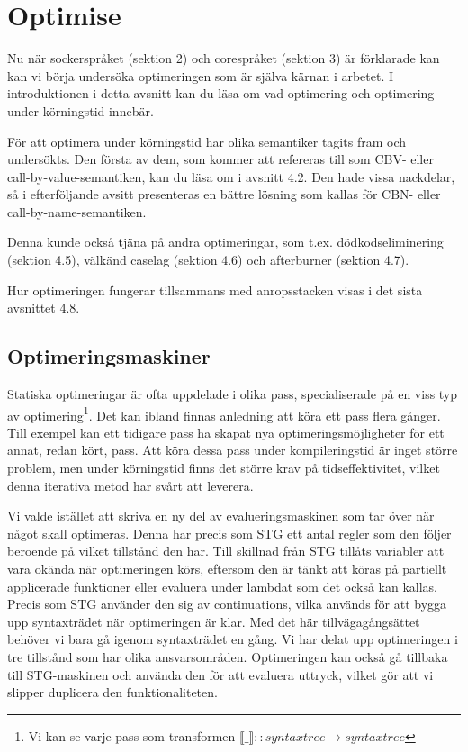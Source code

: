 \documentclass[Rapport]{subfiles}
\begin{document}
\section{Optimise}
\label{sec:Optimise}

\overviewOptimise

Nu när sockerspråket (sektion 2) och corespråket (sektion 3) är förklarade
kan kan vi börja undersöka optimeringen som är själva kärnan i arbetet.
I introduktionen i detta avsnitt kan du läsa om vad optimering och 
optimering under körningstid innebär. 

För att optimera under körningstid har olika semantiker tagits fram och undersökts.   
Den första av dem, som kommer att refereras till som CBV- eller call-by-value-semantiken, 
kan du läsa om i avsnitt 4.2. Den hade vissa nackdelar, så i 
efterföljande avsitt presenteras en bättre lösning som kallas för CBN- eller call-by-name-semantiken.

Denna kunde också tjäna på andra optimeringar, som t.ex.
dödkodseliminering (sektion 4.5), 
välkänd caselag (sektion 4.6) och 
afterburner (sektion 4.7).

Hur optimeringen fungerar tillsammans med anropsstacken visas i det sista avsnittet 4.8.



\subsection{Optimeringsmaskiner}

Statiska optimeringar är ofta uppdelade i olika pass, specialiserade på en viss
typ av optimering\footnote{Vi kan se varje pass som transformen $\llbracket \_ \rrbracket :: syntaxtree \rightarrow syntaxtree$}. Det kan ibland finnas anledning att köra ett pass flera gånger. Till exempel 
kan ett tidigare pass ha skapat nya optimeringsmöjligheter för ett annat, redan kört, pass. 
Att köra dessa pass under kompileringstid är inget större problem, 
men under körningstid finns det större krav på tidseffektivitet, vilket denna iterativa 
metod har svårt att leverera.

Vi valde istället att skriva en ny del av evalueringsmaskinen som tar över när något skall optimeras.
Denna har precis som STG ett antal regler som den följer beroende på vilket
tillstånd den har. Till skillnad från STG tillåts variabler att vara okända när optimeringen
körs, eftersom den är tänkt att köras på partiellt applicerade funktioner eller 
evaluera under lambdat som det också kan kallas.
Precis som STG använder den sig av continuations, vilka används för att bygga upp 
syntaxträdet när optimeringen är klar. Med det här tillvägagångsättet behöver vi 
bara gå igenom syntaxträdet en gång. Vi har delat upp optimeringen i tre tillstånd
som har olika ansvarsområden. Optimeringen kan också gå tillbaka till STG-maskinen
och använda den för att evaluera uttryck, vilket gör att vi slipper duplicera
den funktionaliteten.
\end{document}

